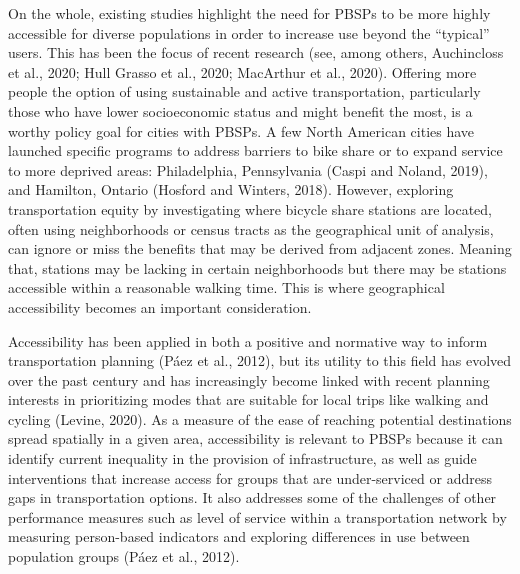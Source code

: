 \documentclass[]{elsarticle} %
\begin{document}
On the whole, existing studies highlight the need for PBSPs to be more
highly accessible for diverse populations in order to increase use
beyond the ``typical'' users. This has been the focus of recent research
(see, among others, Auchincloss et al., 2020; Hull Grasso et al., 2020;
MacArthur et al., 2020). Offering more people the option of using
sustainable and active transportation, particularly those who have lower
socioeconomic status and might benefit the most, is a worthy policy goal
for cities with PBSPs. A few North American cities have launched
specific programs to address barriers to bike share or to expand service
to more deprived areas: Philadelphia, Pennsylvania (Caspi and Noland,
2019), and Hamilton, Ontario (Hosford and Winters, 2018). However,
exploring transportation equity by investigating where bicycle share
stations are located, often using neighborhoods or census tracts as the
geographical unit of analysis, can ignore or miss the benefits that may
be derived from adjacent zones. Meaning that, stations may be lacking in
certain neighborhoods but there may be stations accessible within a
reasonable walking time. This is where geographical accessibility
becomes an important consideration.

Accessibility has been applied in both a positive and normative way to
inform transportation planning (Páez et al., 2012), but its utility to
this field has evolved over the past century and has increasingly become
linked with recent planning interests in prioritizing modes that are
suitable for local trips like walking and cycling (Levine, 2020). As a
measure of the ease of reaching potential destinations spread spatially
in a given area, accessibility is relevant to PBSPs because it can
identify current inequality in the provision of infrastructure, as well
as guide interventions that increase access for groups that are
under-serviced or address gaps in transportation options. It also
addresses some of the challenges of other performance measures such as
level of service within a transportation network by measuring
person-based indicators and exploring differences in use between
population groups (Páez et al., 2012).
\end{document}
